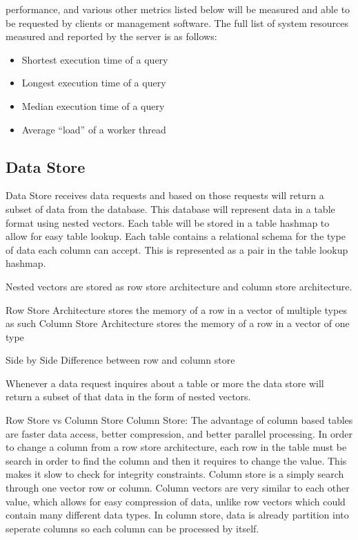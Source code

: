 \documentclass[letterpaper, 12pt]{article}
\begin{document}
performance, and various other metrics listed below will be measured and able to be
requested by clients or management software. The full list of system resources measured
and reported by the server is as follows:
\begin{itemize}
 \item Shortest execution time of a query
 \item Longest execution time of a query
 \item Median execution time of a query
 \item Average ``load'' of a worker thread
\end{itemize}
\par\vspace{\baselineskip}

\subsection{Data Store}
Data Store receives data requests and based on those requests will return a subset of data from
the database. This database will represent data in a table format using nested vectors. Each table
will be stored in a table hashmap to allow for easy table lookup. Each table contains a relational
schema for the type of data each column can accept. This is represented as a pair in the table 
lookup hashmap.


Nested vectors are stored as row store architecture and column store architecture.

Row Store Architecture stores the memory of a row in a vector of multiple types as such
Column Store Architecture stores the memory of a row in a vector of one type

Side by Side Difference between row and column store

Whenever a data request inquires about a table or more the data store will return a subset of that
data in the form of nested vectors. 


Row Store vs Column Store
Column Store:
The advantage of column based tables are faster data access, better compression, and better parallel processing.
In order to change a column from a row store architecture, each row in the table must be search in order to find the
column and then it requires to change the value. This makes it slow to check for integrity constraints. Column store 
is a simply search through one vector row or column. Column vectors are very similar to each other value, which allows
for easy compression of data, unlike row vectors which could contain many different data types. In column store, data
is already partition into seperate columns so each column can be processed by itself. 
\end{document}
